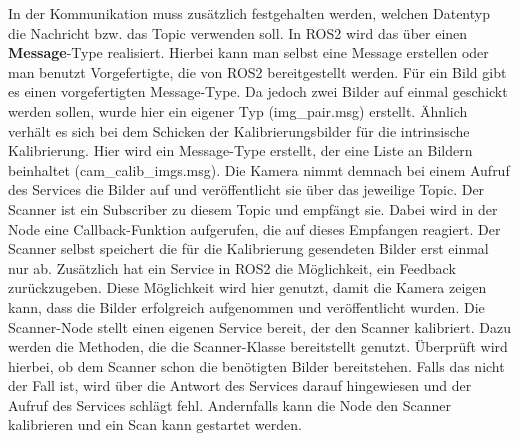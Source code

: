 		In der Kommunikation muss zusätzlich festgehalten werden, welchen Datentyp die Nachricht bzw. das Topic verwenden soll. In ROS2 wird das über einen \textbf{Message}-Type realisiert. Hierbei kann man selbst eine Message erstellen oder man benutzt Vorgefertigte, die von ROS2 bereitgestellt werden. Für ein Bild gibt es einen vorgefertigten Message-Type. Da jedoch zwei Bilder auf einmal geschickt werden sollen, wurde hier ein eigener Typ (img\_pair.msg) erstellt. Ähnlich verhält es sich bei dem Schicken der Kalibrierungsbilder für die intrinsische Kalibrierung. Hier wird ein Message-Type erstellt, der eine Liste an Bildern beinhaltet (cam\_calib\_imgs.msg). Die Kamera nimmt demnach bei einem Aufruf des Services die Bilder auf und veröffentlicht sie über das jeweilige Topic. Der Scanner ist ein Subscriber zu diesem Topic und empfängt sie. Dabei wird in der Node eine Callback-Funktion aufgerufen, die auf dieses Empfangen reagiert. Der Scanner selbst speichert die für die Kalibrierung gesendeten Bilder erst einmal nur ab. Zusätzlich hat ein Service in ROS2 die Möglichkeit, ein Feedback zurückzugeben. Diese Möglichkeit wird hier genutzt, damit die Kamera zeigen kann, dass die Bilder erfolgreich aufgenommen und veröffentlicht wurden.\newline
		Die Scanner-Node stellt einen eigenen Service bereit, der den Scanner kalibriert. Dazu werden die Methoden, die die Scanner-Klasse bereitstellt genutzt. Überprüft wird hierbei, ob dem Scanner schon die benötigten Bilder bereitstehen. Falls das nicht der Fall ist, wird über die Antwort des Services darauf hingewiesen und der Aufruf des Services schlägt fehl. Andernfalls kann die Node den Scanner kalibrieren und ein Scan kann gestartet werden.
		
